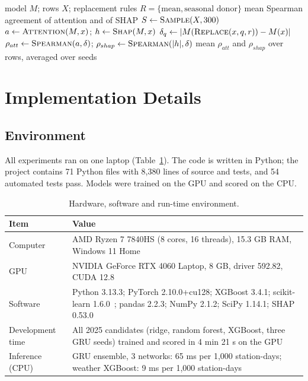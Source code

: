 \documentclass[pdflatex,sn-mathphys-num]{sn-jnl}
\begin{document}
\begin{algorithm}[!htbp]
\caption{Faithfulness audit of a frozen attention model}\label{alg:audit}
\begin{algorithmic}[1]
\Require model $M$; rows $X$; replacement rules $R = \{\text{mean}, \text{seasonal donor}\}$
\Ensure mean Spearman agreement of attention and of SHAP
\State $S \gets \textsc{Sample}(X, 300)$
  \State $a \gets \textsc{Attention}(M, x)$; $h \gets \textsc{Shap}(M, x)$
      \State $\delta_q \gets |M(\textsc{Replace}(x, q, r)) - M(x)|$
    \EndFor
    \State $\rho_{att} \gets \textsc{Spearman}(a, \delta)$; $\rho_{shap} \gets \textsc{Spearman}(|h|, \delta)$
  \EndFor
\EndFor
\State \Return mean $\rho_{att}$ and $\rho_{shap}$ over rows, averaged over seeds
\end{algorithmic}
\end{algorithm}

\section{Implementation Details}\label{sec:impl}

\subsection{Environment}
All experiments ran on one laptop (Table~\ref{tab:setup}). The code is written in Python; the project contains 71 Python files with 8,380 lines of source and tests, and 54 automated tests pass. Models were trained on the GPU and scored on the CPU.

\begin{table}[!htbp]
\centering
\small
\caption{Hardware, software and run-time environment.}\label{tab:setup}
\begin{tabular}{lp{8.4cm}}
\toprule
\textbf{Item} & \textbf{Value} \\
\midrule
Computer & AMD Ryzen 7 7840HS (8 cores, 16 threads), 15.3 GB RAM, Windows 11 Home \\
GPU & NVIDIA GeForce RTX 4060 Laptop, 8 GB, driver 592.82, CUDA 12.8 \\
Software & Python 3.13.3; PyTorch 2.10.0+cu128; XGBoost 3.4.1; scikit-learn 1.6.0~\cite{pedregosa}; pandas 2.2.3; NumPy 2.1.2; SciPy 1.14.1; SHAP 0.53.0 \\
Development time & All 2025 candidates (ridge, random forest, XGBoost, three GRU seeds) trained and scored in 4 min 21 s on the GPU \\
Inference (CPU) & GRU ensemble, 3 networks: 65 ms per 1,000 station-days; weather XGBoost: 9 ms per 1,000 station-days \\
\bottomrule
\end{tabular}
\end{table}
\end{document}

